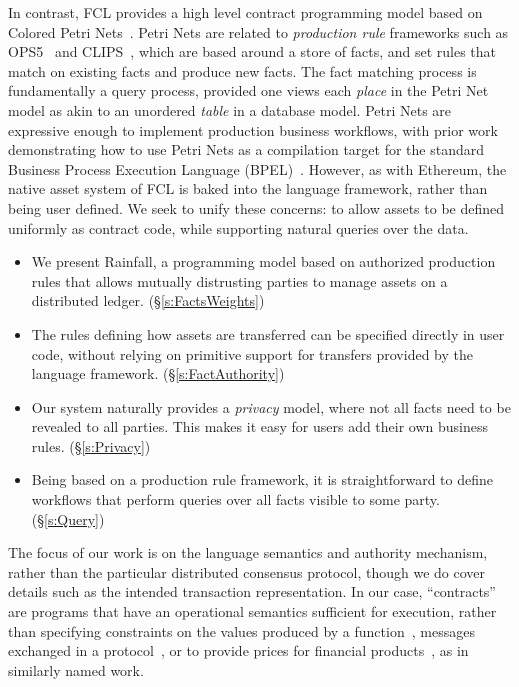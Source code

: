 In contrast, FCL provides a high level contract programming model based on Colored Petri Nets~\cite{Jensen1981:ColouredPetri}. Petri Nets are related to \emph{production rule} frameworks such as OPS5~\cite{Forgy1981:OPS5} and CLIPS~\cite{Riley2017:CLIPS}, which are based around a store of facts, and set rules that match on existing facts and produce new facts. The fact matching process is fundamentally a query process, provided one views each \emph{place} in the Petri Net model as akin to an unordered \emph{table} in a database model. Petri Nets are expressive enough to implement production business workflows, with prior work demonstrating how to use Petri Nets as a compilation target for the standard Business Process Execution Language (BPEL)~\cite{Lohmann2009:PetriBPEL}.  However, as with Ethereum, the native asset system of FCL is baked into the language framework, rather than being user defined. We seek to unify these concerns: to allow assets to be defined uniformly as contract code, while supporting natural queries over the data.

\begin{itemize}
\item We present Rainfall, a programming model based on authorized production rules that allows mutually distrusting parties to manage assets on a distributed ledger. (\S\ref{s:FactsWeights})

\item The rules defining how assets are transferred can be specified directly in user code, without relying on primitive support for transfers provided by the language framework. (\S\ref{s:FactAuthority})

\item Our system naturally provides a \emph{privacy} model, where not all facts need to be revealed to all parties. This makes it easy for users add their own business rules. (\S\ref{s:Privacy})

\item Being based on a production rule framework, it is straightforward to define workflows that perform queries over all facts visible to some party. (\S\ref{s:Query})

\end{itemize}

The focus of our work is on the language semantics and authority mechanism, rather than the particular distributed consensus protocol, though we do cover details such as the intended transaction representation. In our case, ``contracts'' are programs that have an operational semantics sufficient for execution, rather than specifying constraints on the values produced by a function~\cite{Findler2002:Contracts}, messages exchanged in a protocol~\cite{Das2019:Resource, Deon2019:CSL}, or to provide prices for financial products~\cite{PeytonJones2000:Composing}, as in similarly named work.




